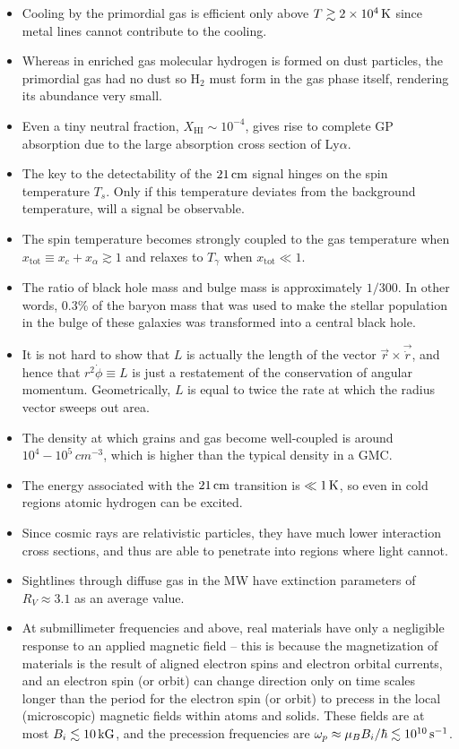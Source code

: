 \documentclass[a4paper,10pt]{article}
\begin{document}
\begin{itemize}
    \item Cooling by the primordial gas is efficient only above $T\gtrsim2\times10^4\,{\rm K}$ since metal lines cannot contribute to the cooling.
    \item Whereas in enriched gas molecular hydrogen is formed on dust particles, the primordial gas had no dust so H$_2$ must form in the gas phase itself, rendering its abundance very small.
    \item Even a tiny neutral fraction, $X_\mathrm{HI}\sim10^{-4}$, gives rise to complete GP absorption due to the large absorption cross section of Ly$\alpha$.
    \item The key to the detectability of the $21\,{\rm cm}$ signal hinges on the spin temperature $T_s$. Only if this temperature deviates from the background temperature, will a signal be observable.
    \item The spin temperature becomes strongly coupled to the gas temperature when $x_\mathrm{tot}\equiv x_c+x_\alpha\gtrsim1$ and relaxes to $T_\gamma$ when $x_\mathrm{tot}\ll1$.
    \item The ratio of black hole mass and bulge mass is approximately $1/300$. In other words, 0.3\% of the baryon mass that was used to make the stellar population in the bulge of these galaxies was transformed into a central black hole.
    \item It is not hard to show that $L$ is actually the length of the vector $\vec{r}\times\vec{\dot{r}}$, and hence that $r^2\dot{\phi}\equiv L$ is just a restatement of the conservation of angular momentum. Geometrically, $L$ is equal to twice the rate at which the radius vector sweeps out area.
    \item The density at which grains and gas become well-coupled is around $10^4-10^5\,{cm^{-3}}$, which is higher than the typical density in a GMC.
    \item The energy associated with the $21\,{\rm cm}$ transition is $\ll1\,{\rm K}$, so even in cold regions atomic hydrogen can be excited.
    \item Since cosmic rays are relativistic particles, they have much lower interaction cross sections, and thus are able to penetrate into regions where light cannot.
    \item Sightlines through diffuse gas in the MW have extinction parameters of $R_V\approx3.1$ as an average value.
    \item At submillimeter frequencies and above, real materials have only a negligible response to an applied magnetic field -- this is because the magnetization of materials is the result of aligned electron spins and electron orbital currents, and an electron spin (or orbit) can change direction only on time scales longer than the period for the electron spin (or orbit) to precess in the local (microscopic) magnetic fields within atoms and solids. These fields are at most $B_i\lesssim10\,{\rm kG}$, and the precession frequencies are $\omega_p\approx \mu_BB_i/\hbar\lesssim10^{10}\,{\rm s^{-1}}$.

\end{itemize}
\end{document}
